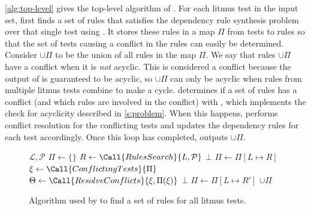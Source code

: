 \autoref{alg:top-level} gives the top-level algorithm of \depsynth.
For each litmus test in the input set, \toplevel first finds a set
of rules that satisfies the dependency rule synthesis problem over
that single test using . It stores these rules in a map $\Pi$
from tests to rules so that the set of tests causing a conflict in the
rules can easily be determined. Consider $\cup\Pi$ to be the union of all rules
in the map $\Pi$. We say that rules $\cup\Pi$ have
a conflict when it is \textit{not} acyclic. This is considered a conflict because the output
of  is guaranteed to be acyclic, so $\cup\Pi$ can only be acyclic
when rules from multiple litmus tests combine to make a cycle.
\toplevel determines if a set of rules has a conflict (and which rules are involved in the conflict)
with , which implements the check for acyclicity described in \autoref{s:problem}.
When this happens, \toplevel performs conflict resolution for the conflicting
tests and updates the dependency rules for each test accordingly.
Once this loop has completed, \toplevel outputs $\cup\Pi$.

\begin{figure}[h]
\begin{algorithmic}[1]
    {$\mathcal{L}, \mathcal{P}$} 
    \State $\Pi \gets \{\}$ 
      \State $R \gets \Call{RulesSearch}{L, \mathcal{P}}$
        \State \Return $\bot$
      \EndIf
      \State $\Pi \gets \Pi[L \mapsto R]$
      \State $\xi \gets \Call{ConflictingTests}{\Pi}$
      \If{$\xi \neq \emptyset$}
        \State $\Theta \gets \Call{ResolveConflicts}{\xi,\Pi(\xi)}$
        \If{$\Theta = \bot$}
          \State \Return $\bot$
        \EndIf
          \State $\Pi \gets \Pi[L \mapsto R']$
        \EndFor
      \EndIf
    \EndFor
    \State \Return $\cup\Pi$
  \EndFunction
\end{algorithmic}
\caption{Algorithm used by \depsynth to find a set of rules for all litmus tests.\tighten}
\label{alg:top-level}
\end{figure}


